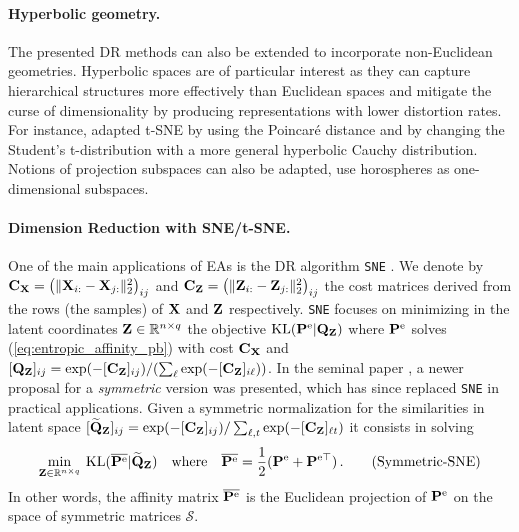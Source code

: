 \paragraph{Hyperbolic geometry.} The presented DR methods can also be extended to incorporate non-Euclidean geometries. Hyperbolic spaces \citep{Chami21, Fan_2022_CVPR, Guo22, Lin23} are of particular interest as they can capture hierarchical structures more effectively than Euclidean spaces and mitigate the curse of dimensionality by producing representations with lower distortion rates. 
For instance, \citet{Guo22} adapted t-SNE by using the Poincaré distance and by changing the Student's t-distribution with a more general hyperbolic Cauchy distribution.  Notions of projection subspaces can also be adapted, \eg \citet{Chami21} use horospheres as one-dimensional subspaces. 


\paragraph{Dimension Reduction with SNE/t-SNE.} One of the main applications of EAs
is the DR algorithm \texttt{SNE} \citep{hinton2002stochastic}. We
denote by $\mathbf{C}_{\mathbf{X}} = \left(\|\mathbf{X}_{i:}-\mathbf{X}_{j:}\|_2^2\right)_{ij}$ and $\mathbf{C}_{\mathbf{Z}} =
\left(\|\mathbf{Z}_{i:}-\mathbf{Z}_{j:}\|_2^2\right)_{ij}$ the cost matrices derived from the
rows (\ie the samples) of $\mathbf{X}$ and $\mathbf{Z}$ respectively. \texttt{SNE} focuses on
minimizing in the latent coordinates $\mathbf{Z} \in \mathbb{R}^{n \times q}$ the objective
$\operatorname{KL}(\mathbf{P}^\mathrm{e} | \mathbf{Q}_{\mathbf{Z}})$ where $\mathbf{P}^\mathrm{e}$ solves
(\ref{eq:entropic_affinity_pb}) with cost $\mathbf{C}_{\mathbf{X}}$ and $[\mathbf{Q}_{\mathbf{Z}}]_{ij} = \exp(-[\mathbf{C}_{\mathbf{Z}}]_{ij})/(\sum_{\ell}\exp(-[\mathbf{C}_{\mathbf{Z}}]_{i\ell}))$. In the seminal paper \citep{van2008visualizing}, a newer proposal for a \emph{symmetric} version was presented, which has since replaced \texttt{SNE} in practical applications. Given a symmetric
normalization for the similarities in latent space $[\widetilde{\mathbf{Q}}_{\mathbf{Z}}]_{ij} = \exp(-[\mathbf{C}_{\mathbf{Z}}]_{ij})/\sum_{\ell,t}\exp(-[\mathbf{C}_{\mathbf{Z}}]_{\ell t})$ it consists in solving 
\begin{align}\label{symmetrization_tsne}
    \min_{\mathbf{Z} \in \mathbb{R}^{n \times q}} \: \operatorname{KL}(\overline{\mathbf{P}^{\mathrm{e}}} | \widetilde{\mathbf{Q}}_{\mathbf{Z}}) \quad \text{where} \quad \overline{\mathbf{P}^{\mathrm{e}}} = \frac{1}{2}(\mathbf{P}^{\mathrm{e}} + \mathbf{P}^{\mathrm{e} \top}) \,.
\tag{Symmetric-SNE}
\end{align}
In other words, the affinity matrix $\overline{\mathbf{P}^{\mathrm{e}}}$ is the Euclidean projection of $\mathbf{P}^{\mathrm{e}}$ on the space of symmetric matrices $\mathcal{S}$.

